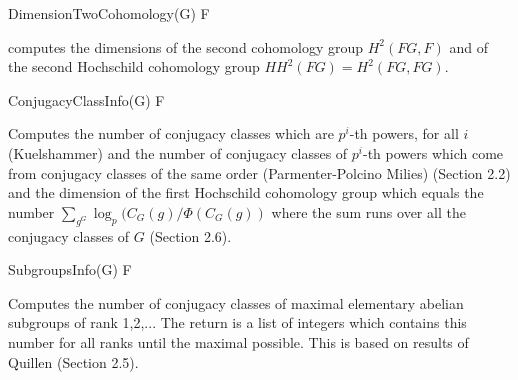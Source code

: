 \> DimensionTwoCohomology(G) F

computes the dimensions of the second cohomology group $H^2(FG, F)$ and of the second
Hochschild cohomology group $HH^2(FG) = H^2(FG, FG)$.

\> ConjugacyClassInfo(G) F

Computes the number of conjugacy classes which are $p^i$-th powers, for all $i$ (Kuelshammer) and
the number of conjugacy classes of $p^i$-th powers which come from conjugacy classes of the same order
 (Parmenter-Polcino Milies) \cite{HS06}(Section 2.2) and the dimension of the first Hochschild 
 cohomology group which equals the number $\sum_{g^G} \log_p(C_G(g)/\Phi(C_G(g))$ where the sum runs over
 all the conjugacy classes of $G$ \cite{HS06}(Section 2.6). 
 
\> SubgroupsInfo(G) F

Computes the number of conjugacy classes of maximal elementary abelian subgroups of rank 1,2,...
The return is a list of integers which contains this number for all ranks until the maximal possible.
This is based on results of Quillen \cite{HS06}(Section 2.5).


